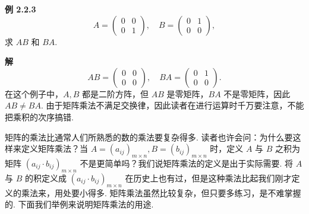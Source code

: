 \documentclass[UTF8,12pt,a4paper,fontset=fandol]{ctexart}
\begin{document}
\noindent\textbf{例 2.2.3}\quad
\[
A=\left(\begin{array}{cc}
0 & 0\\
0 & 1
\end{array}\right),\quad
B=\left(\begin{array}{cc}
0 & 1\\
0 & 0
\end{array}\right),
\]
求 $AB$ 和 $BA$.

\noindent\textbf{解}\quad
\[
AB=\left(\begin{array}{cc}
0 & 0\\
0 & 0
\end{array}\right),\quad
BA=\left(\begin{array}{cc}
0 & 1\\
0 & 0
\end{array}\right).
\]
在这个例子中，$A,B$ 都是二阶方阵，但 $AB$ 是零矩阵，$BA$ 不是零矩阵，因此 $AB\ne BA$. 由于矩阵乘法不满足交换律，因此读者在进行运算时千万要注意，不能把乘积的次序搞错.

矩阵的乘法比通常人们所熟悉的数的乘法要复杂得多. 读者也许会问：为什么要这样来定义矩阵乘法？当 $A=(a_{ij})_{m\times n}, B=(b_{ij})_{m\times n}$ 时，定义 $A$ 与 $B$ 之积为矩阵 $(a_{ij}\cdot b_{ij})_{m\times n}$ 不是更简单吗？我们说矩阵乘法的定义是出于实际需要. 将 $A$ 与 $B$ 的积定义成 $(a_{ij}\cdot b_{ij})_{m\times n}$ 在历史上也有过，但是这种乘法比起我们刚才定义的乘法来，用处要小得多. 矩阵乘法虽然比较复杂，但只要多练习，是不难掌握的. 下面我们举例来说明矩阵乘法的用途.
\end{document}
